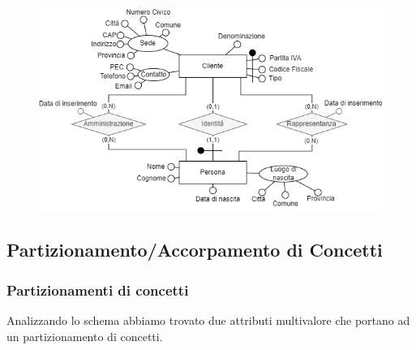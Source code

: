 \documentclass{elegantbook}
\begin{document}
			\begin{figure}[H]
				\centering
				\includegraphics[scale=0.5]{../Img/DBSchemes/Accorpamento-Cliente.png}
			\end{figure}
		\newpage
			
			
	
	\subsection{Partizionamento/Accorpamento di Concetti}
	\subsubsection{Partizionamenti di concetti}
		Analizzando lo schema abbiamo trovato due attributi multivalore che portano ad un partizionamento di concetti.
\end{document}
